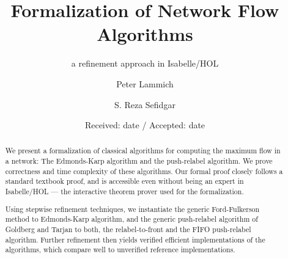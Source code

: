 \documentclass[smallcondensed]{svjour3}     %
\begin{document}
\title{Formalization of Network Flow Algorithms}
\subtitle{a refinement approach in Isabelle/HOL}


\author{Peter Lammich \and S. Reza Sefidgar}



\date{Received: date / Accepted: date}


\maketitle

\begin{abstract}
We present a formalization of classical algorithms for computing the maximum flow in a network:
The Edmonds-Karp algorithm and the push-relabel algorithm. 
We prove correctness and time complexity of these algorithms.
Our formal proof closely follows a standard textbook proof, and is accessible even without being
an expert in Isabelle/HOL --- the interactive theorem prover used for the formalization.

Using stepwise refinement techniques, we instantiate the generic Ford-Fulkerson method to Edmonds-Karp algorithm, 
and the generic push-relabel algorithm of Goldberg and Tarjan to both, the relabel-to-front and the FIFO push-relabel algorithm.
Further refinement then yields verified efficient implementations of the algorithms, which compare well to unverified reference implementations.

\end{abstract}
\end{document}

